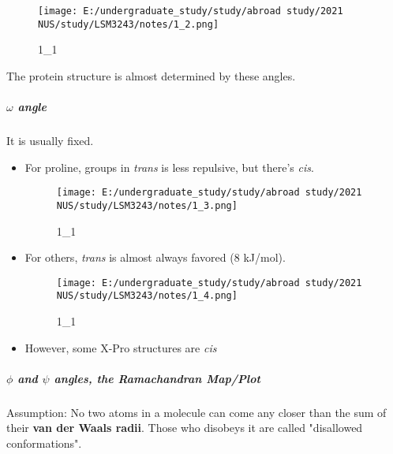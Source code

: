 \documentclass[]{article}
\let\oldsubparagraph\subparagraph
\renewcommand{\subparagraph}[1]{\oldsubparagraph{#1}\mbox{}}
\begin{document}
\begin{figure}
\centering
\texttt{[image: E:/undergraduate\_study/study/abroad study/2021 NUS/study/LSM3243/notes/1\_2.png]}
\caption{1\_1}
\end{figure}

The protein structure is almost determined by these angles.

\hypertarget{angle}{%
\subparagraph{\texorpdfstring{\(\omega\)
angle}{\textbackslash{}omega angle}}\label{angle}}

It is usually fixed.

\begin{itemize}
\item
  For proline, groups in \emph{trans} is less repulsive, but there's
  \emph{cis}.

  \begin{figure}
  \centering
  \texttt{[image: E:/undergraduate\_study/study/abroad study/2021 NUS/study/LSM3243/notes/1\_3.png]}
  \caption{1\_1}
  \end{figure}
\item
  For others, \emph{trans} is almost always favored (8 kJ/mol).

  \begin{figure}
  \centering
  \texttt{[image: E:/undergraduate\_study/study/abroad study/2021 NUS/study/LSM3243/notes/1\_4.png]}
  \caption{1\_1}
  \end{figure}
\item
  However, some X-Pro structures are \emph{cis}
\end{itemize}

\hypertarget{and--angles-the-ramachandran-mapplot}{%
\subparagraph{\texorpdfstring{\(\phi\) and \(\psi\) angles, the
Ramachandran
Map/Plot}{\textbackslash{}phi and \textbackslash{}psi angles, the Ramachandran Map/Plot}}\label{and--angles-the-ramachandran-mapplot}}

Assumption: No two atoms in a molecule can come any closer than the sum
of their \textbf{van der Waals radii}. Those who disobeys it are called
"disallowed conformations".
\end{document}
